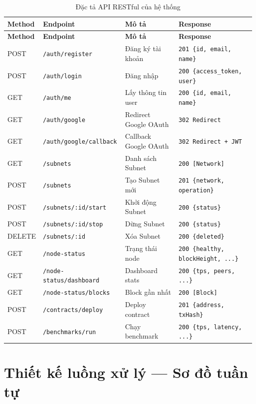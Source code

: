 \begin{longtable}{|l|l|p{3.5cm}|p{4cm}|}
\caption{Đặc tả API RESTful của hệ thống} \label{tab:api_spec} \\
\hline
\textbf{Method} & \textbf{Endpoint} & \textbf{Mô tả} & \textbf{Response} \\ \hline
\endfirsthead
\hline
\textbf{Method} & \textbf{Endpoint} & \textbf{Mô tả} & \textbf{Response} \\ \hline
\endhead
POST & \texttt{/auth/register} & Đăng ký tài khoản & \texttt{201 \{id, email, name\}} \\ \hline
POST & \texttt{/auth/login} & Đăng nhập & \texttt{200 \{access\_token, user\}} \\ \hline
GET & \texttt{/auth/me} & Lấy thông tin user & \texttt{200 \{id, email, name\}} \\ \hline
GET & \texttt{/auth/google} & Redirect Google OAuth & \texttt{302 Redirect} \\ \hline
GET & \texttt{/auth/google/callback} & Callback Google OAuth & \texttt{302 Redirect + JWT} \\ \hline
GET & \texttt{/subnets} & Danh sách Subnet & \texttt{200 [Network]} \\ \hline
POST & \texttt{/subnets} & Tạo Subnet mới & \texttt{201 \{network, operation\}} \\ \hline
POST & \texttt{/subnets/:id/start} & Khởi động Subnet & \texttt{200 \{status\}} \\ \hline
POST & \texttt{/subnets/:id/stop} & Dừng Subnet & \texttt{200 \{status\}} \\ \hline
DELETE & \texttt{/subnets/:id} & Xóa Subnet & \texttt{200 \{deleted\}} \\ \hline
GET & \texttt{/node-status} & Trạng thái node & \texttt{200 \{healthy, blockHeight, ...\}} \\ \hline
GET & \texttt{/node-status/dashboard} & Dashboard stats & \texttt{200 \{tps, peers, ...\}} \\ \hline
GET & \texttt{/node-status/blocks} & Block gần nhất & \texttt{200 [Block]} \\ \hline
POST & \texttt{/contracts/deploy} & Deploy contract & \texttt{201 \{address, txHash\}} \\ \hline
POST & \texttt{/benchmarks/run} & Chạy benchmark & \texttt{200 \{tps, latency, ...\}} \\ \hline
\end{longtable}


\section{Thiết kế luồng xử lý --- Sơ đồ tuần tự}

